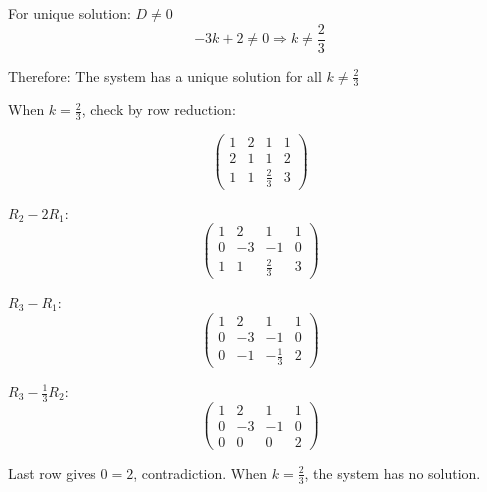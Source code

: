 \documentclass[12pt]{article}
\begin{document}
For unique solution: $D \neq 0$
\[
	-3k + 2 \neq 0 \Rightarrow k \neq \frac{2}{3}
\]

Therefore: The system has a unique solution for all $k \neq \frac{2}{3}$

When $k = \frac{2}{3}$, check by row reduction:

\[
	\left(\begin{array}{ccc|c}
		1 & 2 & 1 & 1 \\
		2 & 1 & 1 & 2 \\
		1 & 1 & \frac{2}{3} & 3
	\end{array}\right)
\]

$R_2 - 2R_1$:
\[
	\left(\begin{array}{ccc|c}
		1 & 2 & 1 & 1 \\
		0 & -3 & -1 & 0 \\
		1 & 1 & \frac{2}{3} & 3
	\end{array}\right)
\]

$R_3 - R_1$:
\[
	\left(\begin{array}{ccc|c}
		1 & 2 & 1 & 1 \\
		0 & -3 & -1 & 0 \\
		0 & -1 & -\frac{1}{3} & 2
	\end{array}\right)
\]

$R_3 - \frac{1}{3}R_2$:
\[
	\left(\begin{array}{ccc|c}
		1 & 2 & 1 & 1 \\
		0 & -3 & -1 & 0 \\
		0 & 0 & 0 & 2
	\end{array}\right)
\]

Last row gives $0 = 2$, contradiction. When $k = \frac{2}{3}$, the system has no solution.
\end{document}
